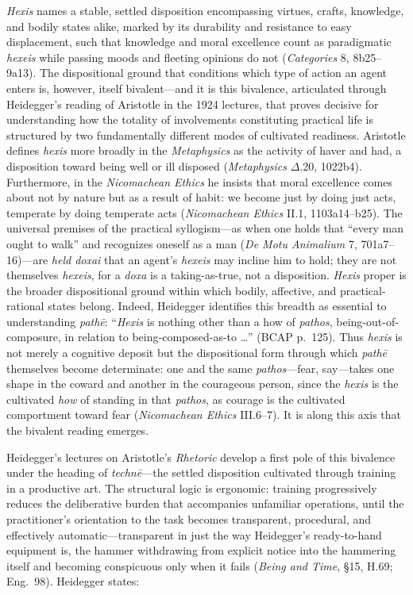 \documentclass{article}
\begin{document}
\textit{Hexis} names a stable, settled disposition encompassing virtues, crafts, knowledge, and bodily states alike, marked by its durability and resistance to easy displacement, such that knowledge and moral excellence count as paradigmatic \textit{hexeis} while passing moods and fleeting opinions do not (\textit{Categories} 8, 8b25--9a13). The dispositional ground that conditions which type of action an agent enters is, however, itself bivalent---and it is this bivalence, articulated through Heidegger's reading of Aristotle in the 1924 lectures, that proves decisive for understanding how the totality of involvements constituting practical life is structured by two fundamentally different modes of cultivated readiness. Aristotle defines \textit{hexis} more broadly in the \textit{Metaphysics} as the activity of haver and had, a disposition toward being well or ill disposed (\textit{Metaphysics} $\Delta$.20, 1022b4). Furthermore, in the \textit{Nicomachean Ethics} he insists that moral excellence comes about not by nature but as a result of habit: we become just by doing just acts, temperate by doing temperate acts (\textit{Nicomachean Ethics} II.1, 1103a14--b25). The universal premises of the practical syllogism---as when one holds that ``every man ought to walk'' and recognizes oneself as a man (\textit{De Motu Animalium} 7, 701a7--16)---are \textit{held doxai} that an agent's \textit{hexeis} may incline him to hold; they are not themselves \textit{hexeis}, for a \textit{doxa} is a taking-as-true, not a disposition. \textit{Hexis} proper is the broader dispositional ground within which bodily, affective, and practical-rational states belong. Indeed, Heidegger identifies this breadth as essential to understanding \textit{pathē}: ``\textit{Hexis} is nothing other than a how of \textit{pathos}, being-out-of-composure, in relation to being-composed-as-to \ldots'' (BCAP p.~125). Thus \textit{hexis} is not merely a cognitive deposit but the dispositional form through which \textit{pathē} themselves become determinate: one and the same \textit{pathos}---fear, say---takes one shape in the coward and another in the courageous person, since the \textit{hexis} is the cultivated \textit{how} of standing in that \textit{pathos}, as courage is the cultivated comportment toward fear (\textit{Nicomachean Ethics} III.6--7). It is along this axis that the bivalent reading emerges.

Heidegger's lectures on Aristotle's \textit{Rhetoric} develop a first pole of this bivalence under the heading of \textit{technē}---the settled disposition cultivated through training in a productive art. The structural logic is ergonomic: training progressively reduces the deliberative burden that accompanies unfamiliar operations, until the practitioner's orientation to the task becomes transparent, procedural, and effectively automatic---transparent in just the way Heidegger's ready-to-hand equipment is, the hammer withdrawing from explicit notice into the hammering itself and becoming conspicuous only when it fails (\textit{Being and Time}, \S15, H.69; Eng.~98). Heidegger states:
\end{document}
